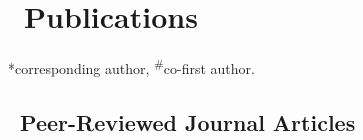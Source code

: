 \newcommand{\Revision}{\textit{under revision}}
\newcommand{\Review}{\textit{under review}}
\newcommand{\Submitted}{\textit{submitted}}
\newcommand{\CS}{*} %
\newcommand{\CF}{\textsuperscript{\#}} %

\section{\texorpdfstring{\faBook\ Publications}{Publications}}
\CS corresponding author, \CF co-first author.

\subsection*{\texorpdfstring{\faBook\ Peer-Reviewed Journal Articles}{Peer-Reviewed Journal Articles}}
